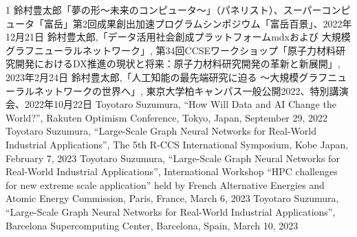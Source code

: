 \begin{招待講演}{1}
 鈴村豊太郎「夢の形～未来のコンピュータ～」（パネリスト）、スーパーコンピュータ「富岳」第2回成果創出加速プログラムシンポジウム「富岳百景」、2022年12月21日
鈴村豊太郎,「データ活用社会創成プラットフォームmdxおよび 大規模グラフニューラルネットワーク」, 第34回CCSEワークショップ「原子力材料研究開発におけるDX推進の現状と将来：原子力材料研究開発の革新と新展開」, 2023年2月24日
鈴村豊太郎,「人工知能の最先端研究に迫る ～大規模グラフニューラルネットワークの世界へ」, 東京大学柏キャンパス一般公開2022、特別講演会、2022年10月22日
Toyotaro Suzumura, “How Will Data and AI Change the World?”,  Rakuten Optimism Conference, Tokyo, Japan, September 29, 2022
Toyotaro Suzumura,  “Large-Scale Graph Neural Networks for Real-World Industrial Applications”, The 5th R-CCS International Symposium, Kobe Japan, February 7, 2023
Toyotaro Suzumura,  “Large-Scale Graph Neural Networks for Real-World Industrial Applications”, International Workshop “HPC challenges for new extreme scale application” held by French Alternative Energies and Atomic Energy Commission, Paris, France, March 6, 2023
Toyotaro Suzumura,  “Large-Scale Graph Neural Networks for Real-World Industrial Applications”, Barcelona Supercomputing Center, Barcelona, Spain, March 10, 2023
\end{招待講演}




